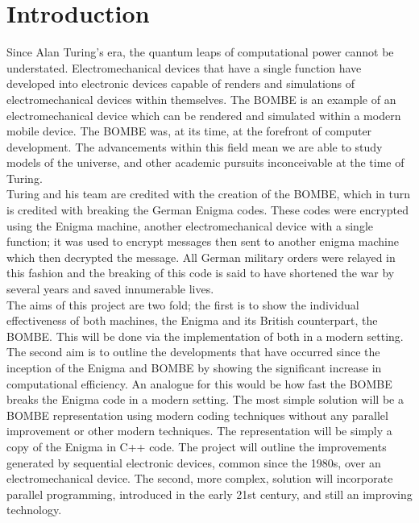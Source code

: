 \documentclass[12pt,a4paper]{article}
\begin{document}
\section{Introduction}

Since Alan Turing's era, the quantum leaps of computational power cannot be understated. Electromechanical devices that have a single function have developed into electronic devices capable of renders and simulations of electromechanical devices within themselves. The BOMBE is an example of an electromechanical device which can be rendered and simulated within a modern mobile device. The BOMBE was, at its time, at the forefront of computer development. The advancements within this field mean we are able to study models of the universe, and other academic pursuits inconceivable at the time of Turing.\\

Turing and his team are credited with the creation of the BOMBE, which in turn is credited with breaking the German Enigma codes. These codes were encrypted using the Enigma machine, another electromechanical device with a single function; it was used to encrypt messages then sent to another enigma machine which then decrypted the message.  All German military orders were relayed in this fashion and the breaking of this code is said to have shortened the war by several years and saved innumerable lives.\\

The aims of this project are two fold; the first is to show the individual effectiveness of both machines, the Enigma and its British counterpart, the BOMBE. This will be done via the implementation of both in a modern setting. The second aim is to outline the developments that have occurred since the inception of the Enigma and BOMBE by showing the significant increase in computational efficiency. An analogue for this would be how fast the BOMBE breaks the Enigma code in a modern setting. The most simple solution will be a BOMBE representation using modern coding techniques without any parallel improvement or other modern techniques. The representation will be simply a copy of the Enigma in C++ code. The project will outline the improvements generated by sequential electronic devices, common since the 1980s, over an electromechanical device. The second, more complex, solution will incorporate parallel programming, introduced in the early 21st century, and still an improving technology.\\
\end{document}

